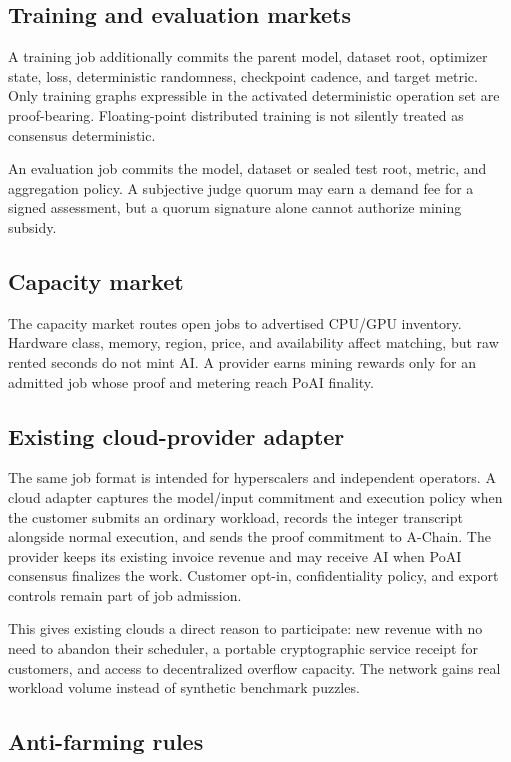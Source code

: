 \subsection{Training and evaluation markets}

A training job additionally commits the parent model, dataset root, optimizer
state, loss, deterministic randomness, checkpoint cadence, and target metric.
Only training graphs expressible in the activated deterministic operation set
are proof-bearing. Floating-point distributed training is not silently treated
as consensus deterministic.

An evaluation job commits the model, dataset or sealed test root, metric, and
aggregation policy. A subjective judge quorum may earn a demand fee for a signed
assessment, but a quorum signature alone cannot authorize mining subsidy.

\subsection{Capacity market}

The capacity market routes open jobs to advertised CPU/GPU inventory. Hardware
class, memory, region, price, and availability affect matching, but raw rented
seconds do not mint AI. A provider earns mining rewards only for an admitted job
whose proof and metering reach PoAI finality.

\subsection{Existing cloud-provider adapter}

The same job format is intended for hyperscalers and independent operators. A
cloud adapter captures the model/input commitment and execution policy when the
customer submits an ordinary workload, records the integer transcript alongside
normal execution, and sends the proof commitment to A-Chain. The provider keeps
its existing invoice revenue and may receive AI when PoAI consensus finalizes
the work. Customer opt-in, confidentiality policy, and export controls remain
part of job admission.

This gives existing clouds a direct reason to participate: new revenue with no
need to abandon their scheduler, a portable cryptographic service receipt for
customers, and access to decentralized overflow capacity. The network gains
real workload volume instead of synthetic benchmark puzzles.

\subsection{Anti-farming rules}

